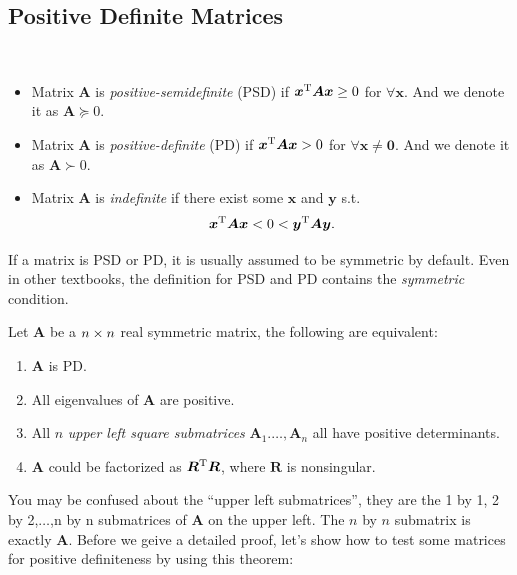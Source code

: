 \subsection{Positive Definite Matrices}
\begin{definition}\qquad\\
\begin{itemize}
\item
Matrix $\bm A$ is \textit{positive-semidefinite} (PSD) if $\bm x^{\mathrm T}\bm A\bm x\ge0$ for $\forall\bm x.$ And we denote it as $\bm A\succeq0.$
\item
Matrix $\bm A$ is \textit{positive-definite} (PD) if $\bm x^{\mathrm T}\bm A\bm x>0$ for $\forall\bm x\ne\bm 0.$ And we denote it as $\bm A\succ0.$
\item
Matrix $\bm A$ is \textit{indefinite} if there exist some $\bm x$ and $\bm y$ s.t.
\[
\bm x^{\mathrm T}\bm A\bm x<0<\bm y^{\mathrm T}\bm A\bm y.
\]
\end{itemize}
\end{definition}
\begin{remark}
If a matrix is PSD or PD, it is usually assumed to be symmetric by default. Even in other textbooks, the definition for PSD and PD contains the \textit{symmetric} condition.
\end{remark}
\begin{theorem}\label{PD_theorem}
Let $\bm A$ be a $n\times n$ real symmetric matrix, the following are equivalent:
\begin{enumerate}
\item
$\bm A$ is PD.
\item
All eigenvalues of $\bm A$ are positive.
\item
All $n$ \textit{upper left square submatrices} $\bm A_1.\dots,\bm A_n$ all have positive determinants.
\item
$\bm A$ could be factorized as $\bm R^{\mathrm T}\bm R$, where $\bm R$ is nonsingular.
\end{enumerate}
\end{theorem}
You may be confused about the ``upper left submatrices'', they are the 1 by 1, 2 by 2,$\dots$,n by n submatrices of $\bm A$ on the upper left. The $n$ by $n$ submatrix is exactly $\bm A$. Before we geive a detailed proof, let's show how to test some matrices for positive definiteness by using this theorem:
